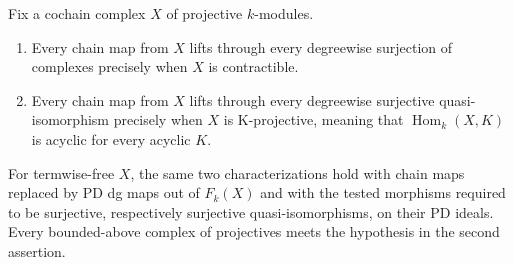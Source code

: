 \begin{theorem}
\label{B004}
Fix a cochain complex $X$ of projective $k$-modules.
\begin{enumerate}
\item Every chain map from $X$ lifts through every degreewise
surjection of complexes precisely when $X$ is contractible.
\item Every chain map from $X$ lifts through every degreewise
surjective quasi-isomorphism precisely when $X$ is K-projective,
meaning that $\operatorname{Hom}_k(X,K)$ is acyclic for every acyclic $K$.
\end{enumerate}
For termwise-free $X$, the same two characterizations hold with chain
maps replaced by PD dg maps out of $F_k(X)$ and with the tested
morphisms required to be surjective, respectively surjective
quasi-isomorphisms, on their PD ideals.  Every bounded-above complex of
projectives meets the hypothesis in the second assertion.
\end{theorem}

